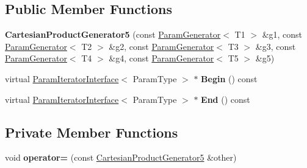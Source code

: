 \subsection*{Public Member Functions}
\begin{DoxyCompactItemize}
\item 
\mbox{\label{classtesting_1_1internal_1_1_cartesian_product_generator5_ab25fd0df9d6325f10f218c3b7553820d}} 
{\bfseries Cartesian\+Product\+Generator5} (const \mbox{\hyperlink{classtesting_1_1internal_1_1_param_generator}{Param\+Generator}}$<$ T1 $>$ \&g1, const \mbox{\hyperlink{classtesting_1_1internal_1_1_param_generator}{Param\+Generator}}$<$ T2 $>$ \&g2, const \mbox{\hyperlink{classtesting_1_1internal_1_1_param_generator}{Param\+Generator}}$<$ T3 $>$ \&g3, const \mbox{\hyperlink{classtesting_1_1internal_1_1_param_generator}{Param\+Generator}}$<$ T4 $>$ \&g4, const \mbox{\hyperlink{classtesting_1_1internal_1_1_param_generator}{Param\+Generator}}$<$ T5 $>$ \&g5)
\item 
\mbox{\label{classtesting_1_1internal_1_1_cartesian_product_generator5_ae5b21ceed037d725dd48ea54cb8d012a}} 
virtual \mbox{\hyperlink{classtesting_1_1internal_1_1_param_iterator_interface}{Param\+Iterator\+Interface}}$<$ Param\+Type $>$ $\ast$ {\bfseries Begin} () const
\item 
\mbox{\label{classtesting_1_1internal_1_1_cartesian_product_generator5_a0775fef90fab1c6a11378b9bcca89849}} 
virtual \mbox{\hyperlink{classtesting_1_1internal_1_1_param_iterator_interface}{Param\+Iterator\+Interface}}$<$ Param\+Type $>$ $\ast$ {\bfseries End} () const
\end{DoxyCompactItemize}
\subsection*{Private Member Functions}
\begin{DoxyCompactItemize}
\item 
\mbox{\label{classtesting_1_1internal_1_1_cartesian_product_generator5_aa6aadc923c5f6cd83ee4ae26b0fe6af3}} 
void {\bfseries operator=} (const \mbox{\hyperlink{classtesting_1_1internal_1_1_cartesian_product_generator5}{Cartesian\+Product\+Generator5}} \&other)
\end{DoxyCompactItemize}

